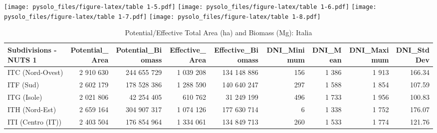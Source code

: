 \documentclass[
  a4paper]{article}
\begin{document}
\texttt{[image: pysolo\_files/figure-latex/table 1-5.pdf]} \pagebreak
\texttt{[image: pysolo\_files/figure-latex/table 1-6.pdf]} \pagebreak
\texttt{[image: pysolo\_files/figure-latex/table 1-7.pdf]} \pagebreak
\texttt{[image: pysolo\_files/figure-latex/table 1-8.pdf]} \pagebreak

\begin{table}

\caption{\label{tab:table 1}Potential/Effective Total Area (ha) and Biomass (Mg): Italia}
\centering
\begin{tabular}[t]{lrrrrrrrr}
\toprule
Subdivisions - NUTS 1 & Potential\_Area & Potential\_Biomass & Effective\_Area & Effective\_Biomass & DNI\_Minimum & DNI\_Mean & DNI\_Maximum & DNI\_StdDev\\
\midrule
ITC (Nord-Ovest) & 2 910 630 & 244 655 729 & 1 039 208 & 134 148 886 & 156 & 1 386 & 1 913 & 166.34\\
ITF (Sud) & 2 602 179 & 178 528 386 & 1 288 590 & 140 640 247 & 297 & 1 588 & 1 854 & 107.59\\
ITG (Isole) & 2 021 806 & 42 254 405 & 610 762 & 31 249 199 & 496 & 1 733 & 1 956 & 100.83\\
ITH (Nord-Est) & 2 659 164 & 304 907 317 & 1 074 126 & 177 630 714 & 6 & 1 338 & 1 752 & 176.07\\
ITI (Centro (IT)) & 2 403 504 & 176 854 964 & 1 334 061 & 134 849 713 & 260 & 1 533 & 1 774 & 121.76\\
\bottomrule
\end{tabular}
\end{table}
\end{document}
